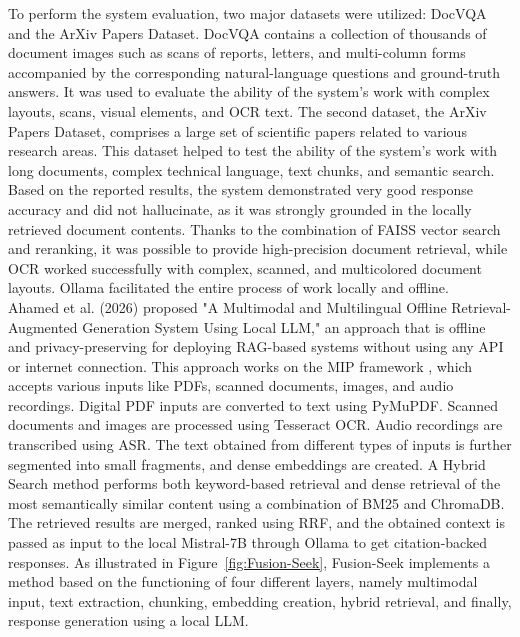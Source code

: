 \documentclass[11pt,a4paper]{report}
\begin{document}
To perform the system evaluation, two major datasets were utilized: DocVQA and the ArXiv Papers Dataset. DocVQA contains a collection of thousands of document images such as scans of reports, letters, and multi-column forms accompanied by the corresponding natural-language questions and ground-truth answers. It was used to evaluate the ability of the system's work with complex layouts, scans, visual elements, and \ac{OCR} text. The second dataset, the ArXiv Papers Dataset, comprises a large set of scientific papers related to various research areas. This dataset helped to test the ability of the system's work with long documents, complex technical language, text chunks, and semantic search. Based on the reported results, the system demonstrated very good response accuracy and did not hallucinate, as it was strongly grounded in the locally retrieved document contents. Thanks to the combination of \ac{FAISS} vector search and reranking, it was possible to provide high-precision document retrieval, while \ac{OCR} worked successfully with complex, scanned, and multicolored document layouts. Ollama facilitated the entire process of work locally and offline.\\

Ahamed et al. \cite{AlthafAhamed2026AMA} (2026) proposed "A Multimodal and Multilingual Offline Retrieval-Augmented Generation System Using Local \ac{LLM}," an approach that is offline and privacy-preserving for deploying \ac{RAG}-based systems without using any \ac{API} or internet connection. This approach works on the \ac{MIP} framework , which accepts various inputs like PDFs, scanned documents, images, and audio recordings. Digital PDF inputs are converted to text using PyMuPDF. Scanned documents and images are processed using Tesseract \ac{OCR}. Audio recordings are transcribed using \ac{ASR}. The text obtained from different types of inputs is further segmented into small fragments, and dense embeddings are created. A Hybrid Search method performs both keyword-based retrieval and dense retrieval of the most semantically similar content using a combination of \ac{BM25} and ChromaDB. The retrieved results are merged, ranked using \ac{RRF}, and the obtained context is passed as input to the local Mistral-7B through Ollama to get citation-backed responses. As illustrated in Figure~\ref{fig:Fusion-Seek}, Fusion-Seek implements a method based on the functioning of four different layers, namely multimodal input, text extraction, chunking, embedding creation, hybrid retrieval, and finally, response generation using a local \ac{LLM}.
\end{document}
